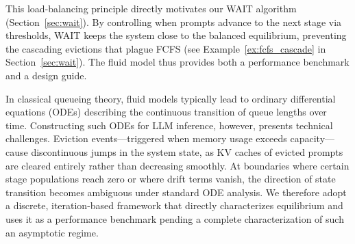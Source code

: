 This load-balancing principle directly motivates our WAIT algorithm (Section~\ref{sec:wait}). By controlling when prompts advance to the next stage via thresholds, WAIT keeps the system close to the balanced equilibrium, preventing the cascading evictions that plague FCFS (see Example~\ref{ex:fcfs_cascade} in Section~\ref{sec:wait}). The fluid model thus provides both a performance benchmark and a design guide.

In classical queueing theory, fluid models typically lead to ordinary differential equations (ODEs) describing the continuous transition of queue lengths over time. Constructing such ODEs for LLM inference, however, presents technical challenges. Eviction events---triggered when memory usage exceeds capacity---cause discontinuous jumps in the system state, as KV caches of evicted prompts are cleared entirely rather than decreasing smoothly. At boundaries where certain stage populations reach zero or where drift terms vanish, the direction of state transition becomes ambiguous under standard ODE analysis. We therefore adopt a discrete, iteration-based framework that directly characterizes equilibrium and uses it as a performance benchmark pending a complete characterization of such an asymptotic regime.




